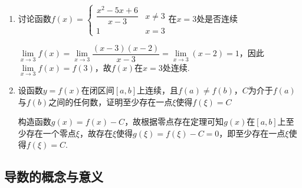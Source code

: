 \begin{enumerate}
    \item 讨论函数$f(x) = \left\{\begin{array}{ll}
         \dfrac{x^2-5x+6}{x-3} & x \neq 3\\
         1 & x = 3
    \end{array}\right.$在$x = 3$处是否连续
    \begin{jieda}
        $\lim\limits_{x \to 3}f(x) = \lim\limits_{x \to 3}\dfrac{(x-3)(x-2)}{x-3} = \lim\limits_{x \to 3}(x-2) = 1$，因此$\lim\limits_{x \to 3}f(x) = f(3)$，故$f(x)$在$x = 3$处连续.
    \end{jieda}
    \item 设函数$y = f(x)$在闭区间$[a, b]$上连续，且$f(a) \neq f(b)$，$C$为介于$f(a)$与$f(b)$之间的任何数，证明至少存在一点$\xi$使得$f(\xi) = C$
    \begin{jieda}
        构造函数$g(x) = f(x) - C$，故根据零点存在定理可知$g(x)$在$[a, b]$上至少存在一个零点$\xi$，故存在$\xi$使得$g(\xi) = f(\xi) - C = 0$，即至少存在一点$\xi$使得$f(\xi) = C$.
    \end{jieda}
\end{enumerate}
\clearpage
\subsection*{导数的概念与意义}

